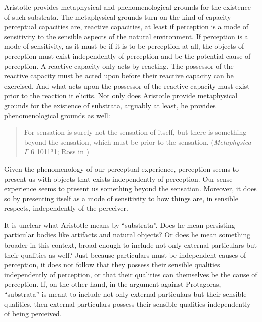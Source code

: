 Aristotle provides metaphysical and phenomenological grounds for the existence of such substrata. The metaphysical grounds turn on the kind of capacity perceptual capacities are, reactive capacities, at least if perception is a mode of sensitivity to the sensible aspects of the natural environment. If perception is a mode of sensitivity, as it must be if it is to be perception at all, the objects of perception must exist independently of perception and be the potential cause of perception. A reactive capacity only acts by reacting. The possessor of the reactive capacity must be acted upon before their reactive capacity can be exercised. And what acts upon the possessor of the reactive capacity must exist prior to the reaction it elicits. Not only does Aristotle provide metaphysical grounds for the existence of substrata, arguably at least, he provides phenomenological grounds as well: 
\begin{quote}
	For sensation is surely not the sensation of itself, but there is something beyond the sensation, which must be prior to the sensation. (\emph{Metaphysica} \( \Gamma \) 6 1011\( ^{a} \)1; Ross in \citealt[56]{Barnes:1984kx})
\end{quote}
Given the phenomenology of our perceptual experience, perception seems to present us with objects that exists independently of perception. Our sense experience seems to present us something beyond the sensation. Moreover, it does so by presenting itself as a mode of sensitivity to how things are, in sensible respects, independently of the perceiver.

It is unclear what Aristotle means by ``substrata''. Does he mean persisting particular bodies like artifacts and natural objects? Or does he mean something broader in this context, broad enough to include not only external particulars but their qualities as well? Just because particulars must be independent causes of perception, it does not follow that they possess their sensible qualities independently of perception, or that their qualities can themselves be the cause of perception. If, on the other hand, in the argument against Protagoras, ``substrata'' is meant to include not only external particulars but their sensible qualities, then external particulars possess their sensible qualities independently of being perceived. 

